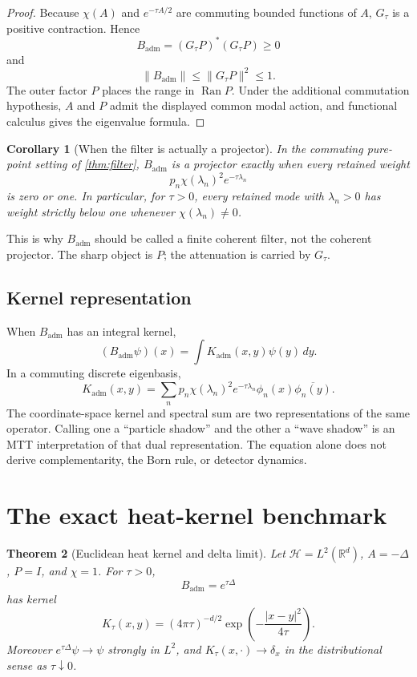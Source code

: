 \documentclass[11pt]{article}
\newtheorem{theorem}{Theorem}[section]
\newtheorem{corollary}[theorem]{Corollary}
\theoremstyle{definition}
\theoremstyle{remark}
\newcommand{\Hspace}{\mathcal H}
\newcommand{\Badm}{B_{\mathrm{adm}}}
\newcommand{\Kadm}{K_{\mathrm{adm}}}
\newcommand{\Ran}{\operatorname{Ran}}
\newcommand{\Id}{I}
\begin{document}
\begin{proof}
Because \(\chi(A)\) and \(e^{-\tau A/2}\) are commuting bounded functions of
\(A\), \(G_\tau\) is a positive contraction. Hence
\[
 \Badm=(G_\tau P)^\ast(G_\tau P)\geq0
\]
and
\[
 \|\Badm\|\leq\|G_\tau P\|^2\leq1.
\]
The outer factor \(P\) places the range in \(\Ran P\). Under the additional
commutation hypothesis, \(A\) and \(P\) admit the displayed common modal
action, and functional calculus gives the eigenvalue formula.
\end{proof}

\begin{corollary}[When the filter is actually a projector]
\label{cor:idempotence}
In the commuting pure-point setting of \autoref{thm:filter}, \(\Badm\) is a
projector exactly when every retained weight
\[
 p_n\chi(\lambda_n)^2e^{-\tau\lambda_n}
\]
is zero or one. In particular, for \(\tau>0\), every retained mode with
\(\lambda_n>0\) has weight strictly below one whenever
\(\chi(\lambda_n)\neq0\).
\end{corollary}

This is why \(\Badm\) should be called a finite coherent filter, not the
coherent projector. The sharp object is \(P\); the attenuation is carried by
\(G_\tau\).

\subsection{Kernel representation}

When \(\Badm\) has an integral kernel,
\[
 (\Badm\psi)(x)=\int \Kadm(x,y)\psi(y)\,dy.
\]
In a commuting discrete eigenbasis,
\begin{equation}
 \Kadm(x,y)=
 \sum_n p_n\chi(\lambda_n)^2e^{-\tau\lambda_n}
 \phi_n(x)\overline{\phi_n(y)}.
 \label{eq:spectral-kernel}
\end{equation}
The coordinate-space kernel and spectral sum are two representations of the
same operator. Calling one a ``particle shadow'' and the other a ``wave
shadow'' is an MTT interpretation of that dual representation. The equation
alone does not derive complementarity, the Born rule, or detector dynamics.

\section{The exact heat-kernel benchmark}

\begin{theorem}[Euclidean heat kernel and delta limit]
\label{thm:heat}
Let \(\Hspace=L^2(\mathbb R^d)\), \(A=-\Delta\), \(P=\Id\), and
\(\chi=1\). For \(\tau>0\),
\[
 \Badm=e^{\tau\Delta}
\]
has kernel
\begin{equation}
 K_\tau(x,y)=
 (4\pi\tau)^{-d/2}
 \exp\!\left(-\frac{|x-y|^2}{4\tau}\right).
 \label{eq:heat-kernel}
\end{equation}
Moreover \(e^{\tau\Delta}\psi\to\psi\) strongly in \(L^2\), and
\(K_\tau(x,\cdot)\to\delta_x\) in the distributional sense as
\(\tau\downarrow0\).
\end{theorem}
\end{document}
